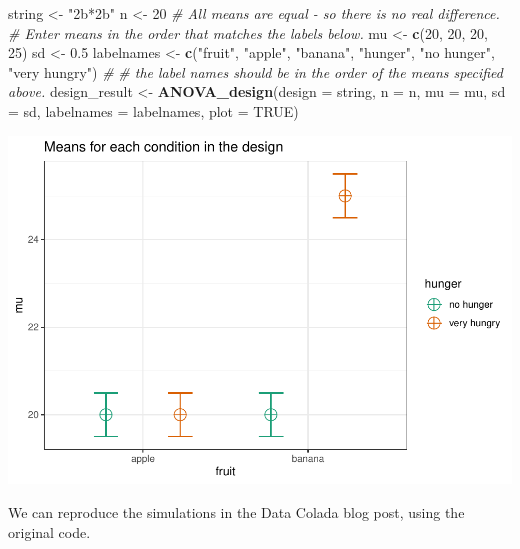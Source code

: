 \documentclass[]{book}
\newenvironment{Shaded}{\begin{snugshade}}{\end{snugshade}}
\newcommand{\CommentTok}[1]{\textcolor[rgb]{0.56,0.35,0.01}{\textit{#1}}}
\newcommand{\DataTypeTok}[1]{\textcolor[rgb]{0.13,0.29,0.53}{#1}}
\newcommand{\DecValTok}[1]{\textcolor[rgb]{0.00,0.00,0.81}{#1}}
\newcommand{\FloatTok}[1]{\textcolor[rgb]{0.00,0.00,0.81}{#1}}
\newcommand{\KeywordTok}[1]{\textcolor[rgb]{0.13,0.29,0.53}{\textbf{#1}}}
\newcommand{\NormalTok}[1]{#1}
\newcommand{\OtherTok}[1]{\textcolor[rgb]{0.56,0.35,0.01}{#1}}
\newcommand{\StringTok}[1]{\textcolor[rgb]{0.31,0.60,0.02}{#1}}
\begin{document}
\begin{Shaded}
\begin{Highlighting}[]
\NormalTok{string <-}\StringTok{ "2b*2b"}
\NormalTok{n <-}\StringTok{ }\DecValTok{20}
\CommentTok{# All means are equal - so there is no real difference.}
\CommentTok{# Enter means in the order that matches the labels below.}
\NormalTok{mu <-}\StringTok{ }\KeywordTok{c}\NormalTok{(}\DecValTok{20}\NormalTok{, }\DecValTok{20}\NormalTok{, }\DecValTok{20}\NormalTok{, }\DecValTok{25}\NormalTok{) }
\NormalTok{sd <-}\StringTok{ }\FloatTok{0.5}
\NormalTok{labelnames <-}\StringTok{ }\KeywordTok{c}\NormalTok{(}\StringTok{"fruit"}\NormalTok{, }\StringTok{"apple"}\NormalTok{, }\StringTok{"banana"}\NormalTok{, }
                \StringTok{"hunger"}\NormalTok{, }\StringTok{"no hunger"}\NormalTok{, }\StringTok{"very hungry"}\NormalTok{) }\CommentTok{#}
\CommentTok{# the label names should be in the order of the means specified above.}
\NormalTok{design_result <-}\StringTok{ }\KeywordTok{ANOVA_design}\NormalTok{(}\DataTypeTok{design =}\NormalTok{ string,}
                   \DataTypeTok{n =}\NormalTok{ n, }
                   \DataTypeTok{mu =}\NormalTok{ mu, }
                   \DataTypeTok{sd =}\NormalTok{ sd, }
                   \DataTypeTok{labelnames =}\NormalTok{ labelnames,}
                   \DataTypeTok{plot =} \OtherTok{TRUE}\NormalTok{)}
\end{Highlighting}
\end{Shaded}

\includegraphics{SuperpowerValidation_files/figure-latex/unnamed-chunk-158-1.pdf}

We can reproduce the simulations in the Data Colada blog post, using the original code.
\end{document}
